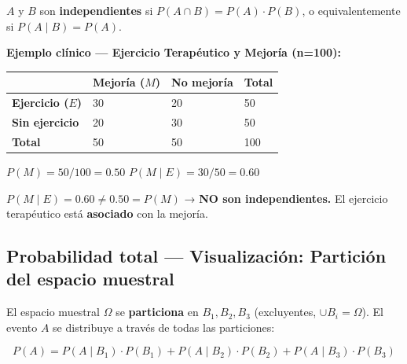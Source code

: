 \documentclass[
  letterpaper,
  DIV=11,
  numbers=noendperiod]{scrartcl}
\newcounter{none} %
\begin{document}
\(A\) y \(B\) son \textbf{independientes} si
\(P(A \cap B) = P(A) \cdot P(B)\), o equivalentemente si
\(P(A \mid B) = P(A)\).

\textbf{Ejemplo clínico --- Ejercicio Terapéutico y Mejoría (n=100):}

{\def\LTcaptype{none} %
\begin{longtable}[]{@{}llll@{}}
\toprule\noalign{}
& Mejoría (\(M\)) & No mejoría & Total \\
\midrule\noalign{}
\endhead
\bottomrule\noalign{}
\endlastfoot
\textbf{Ejercicio (\(E\))} & 30 & 20 & 50 \\
\textbf{Sin ejercicio} & 20 & 30 & 50 \\
\textbf{Total} & 50 & 50 & 100 \\
\end{longtable}
}

\(P(M) = 50/100 = 0.50\) \(P(M \mid E) = 30/50 = 0.60\)

\(P(M \mid E) = 0.60 \neq 0.50 = P(M)\) → \textbf{NO son
independientes.} El ejercicio terapéutico está \textbf{asociado} con la
mejoría.

\subsection{Probabilidad total --- Visualización: Partición del espacio
muestral}\label{probabilidad-total-visualizacion-particion-del-espacio-muestral}

El espacio muestral \(\Omega\) se \textbf{particiona} en
\(B_1, B_2, B_3\) (excluyentes, \(\cup B_i = \Omega\)). El evento \(A\)
se distribuye a través de todas las particiones:

\[P(A) = P(A \mid B_1) \cdot P(B_1) + P(A \mid B_2) \cdot P(B_2) + P(A \mid B_3) \cdot P(B_3)\]
\end{document}
